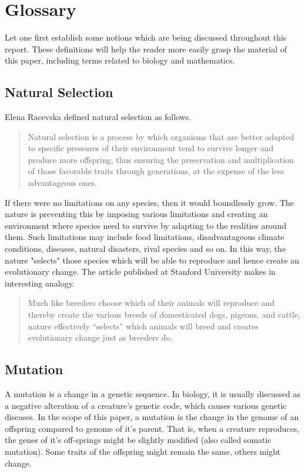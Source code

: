 \documentclass{article}
\begin{document}
\section{Glossary}

Let one first establish some notions which are being discussed throughout this report. These definitions will help the reader more easily grasp the material of this paper, including terms related to biology and mathematics.

\subsection{Natural Selection}

Elena Racevska defined natural selection as follows.

\begin{quotation}
    Natural selection is a process by which organisms that are better adapted to specific pressures of their environment tend to survive longer and produce more offspring, thus ensuring the preservation and multiplication of those favorable traits through generations, at the expense of the less advantageous ones.
\end{quotation}

If there were no limitations on any species, then it would boundlessly grow. The nature is preventing this by imposing various limitations and creating an environment where species need to survive by adapting to the realities around them. Such limitations may include food limitations, disadvantageous climate conditions, diseases, natural disasters, rival species and so on. In this way, the nature "selects" those species which will be able to reproduce and hence create an evolutionary change. The article published at Stanford University makes in interesting analogy. 

\begin{quotation}
    Much like breeders choose which of their animals will reproduce and thereby create the various breeds of domesticated dogs, pigeons, and cattle, nature effectively “selects” which animals will breed and creates evolutionary change just as breeders do.
\end{quotation}

\subsection{Mutation}

A mutation is a change in a genetic sequence. In biology, it is usually discussed as a negative alteration of a creature's genetic code, which causes various genetic diseases. In the scope of this paper, a mutation is the change in the genome of an offspring compared to genome of it's parent. That is, when a creature reproduces, the genes of it's off-springs might be slightly modified (also called somatic mutation). Some traits of the offspring might remain the same, others might change.
\end{document}
